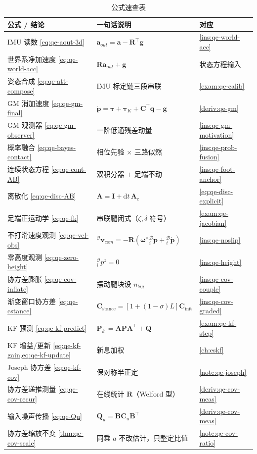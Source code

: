 \begin{table}[H]\centering\small
\caption{公式速查表}
\begin{tabular}{lll}
\toprule
公式 / 结论 & 一句话说明 & 对应 \\
\midrule
IMU 读数 \cref{eq:qe-aout-3d} & $\boldsymbol a_{out}=\boldsymbol a-\mathbf{R}^\top\boldsymbol g$ & \cref{ins:qe-world-acc} \\
世界系净加速度 \cref{eq:qe-world-acc} & $\mathbf{R}\boldsymbol a_{out}+\boldsymbol g$ & 状态方程输入 \\
姿态合成 \cref{eq:qe-att-compose} & IMU 标定链三段串联 & \cref{exam:qe-calib} \\
GM 消加速度 \cref{eq:qe-gm-final} & $\dot{\boldsymbol p}=\boldsymbol\tau+\boldsymbol\tau_K+\mathbf{C}^\top\dot{\boldsymbol q}-\boldsymbol g$ & \cref{deriv:qe-gm} \\
GM 观测器 \cref{eq:qe-gm-observer} & 一阶低通残差动量 & \cref{ins:qe-gm-motivation} \\
概率融合 \cref{eq:qe-bayes-contact} & 相位先验 $\times$ 三路似然 & \cref{ins:qe-prob-fusion} \\
连续状态方程 \cref{eq:qe-cont-AB} & 双积分器 $+$ 足端不动 & \cref{ins:qe-foot-anchor} \\
离散化 \cref{eq:qe-disc-AB} & $\mathbf{A}=\mathbf{I}+\mathrm{d}t\,\mathbf{A}_c$ & \cref{eq:qe-disc-explicit} \\
足端正运动学 \cref{eq:qe-fk} & 串联腿闭式（$\zeta,\delta$ 符号） & \cref{exam:qe-jacobian} \\
不打滑速度观测 \cref{eq:qe-vel-obs} & ${}^{\mathcal{O}}\boldsymbol v_{com}=-\mathbf{R}(\boldsymbol\omega^\wedge{}^{\mathcal{B}}_{i}\boldsymbol p+{}^{\mathcal{B}}_{i}\dot{\boldsymbol p})$ & \cref{ins:qe-noslip} \\
零高度观测 \cref{eq:qe-zero-height} & ${}^{\mathcal{O}}_{i}p^z=0$ & \cref{ins:qe-height} \\
协方差膨胀 \cref{eq:qe-cov-inflate} & 摆动腿块设 $n_{big}$ & \cref{ins:qe-cov-couple} \\
渐变窗口协方差 \cref{eq:qe-cstance} & $\mathbf{C}_{\mathrm{stance}}=[1+(1-\sigma)L]\mathbf{C}_{\mathrm{init}}$ & \cref{ins:qe-cov-graded} \\
KF 预测 \cref{eq:qe-kf-predict} & $\mathbf{P}_k^-=\mathbf{A}\mathbf{P}\mathbf{A}^\top+\mathbf{Q}$ & \cref{exam:qe-kf-step} \\
KF 增益/更新 \cref{eq:qe-kf-gain,eq:qe-kf-update} & 新息加权 & \cref{ch:eskf} \\
Joseph 协方差 \cref{eq:qe-kf-cov} & 保对称半正定 & \cref{note:qe-joseph} \\
协方差递推测量 \cref{eq:qe-cov-recur} & 在线统计 $\mathbf{R}$（Welford 型） & \cref{deriv:qe-cov-meas} \\
输入噪声传播 \cref{eq:qe-Qu} & $\mathbf{Q}_u=\mathbf{B}\mathbf{C}_u\mathbf{B}^\top$ & \cref{deriv:qe-cov-meas} \\
协方差缩放不变 \cref{thm:qe-cov-scale} & 同乘 $a$ 不改估计，只整定比值 & \cref{note:qe-cov-ratio} \\
\bottomrule
\end{tabular}
\end{table}

